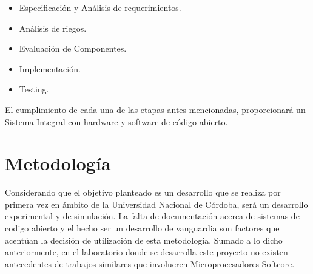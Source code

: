 \begin {itemize}
	\item Especificación y Análisis de requerimientos.
	\item Análisis de riegos.
	\item Evaluación de Componentes.
	\item Implementación.
	\item Testing.
\end {itemize}

El cumplimiento de cada una de las etapas antes mencionadas, proporcionará un Sistema Integral con hardware y software de código abierto.

\section{Metodología}
Considerando que el objetivo planteado es un desarrollo que se realiza por primera vez en ámbito de la Universidad Nacional de Córdoba, será un
desarrollo experimental y de simulación. La falta de documentación acerca de sistemas de codigo abierto y el hecho ser un desarrollo de vanguardia son
factores que acentúan la decisión de utilización de esta metodología. Sumado a lo dicho anteriormente, en el laboratorio donde se desarrolla este
proyecto no existen antecedentes de trabajos similares que involucren Microprocesadores Softcore.
